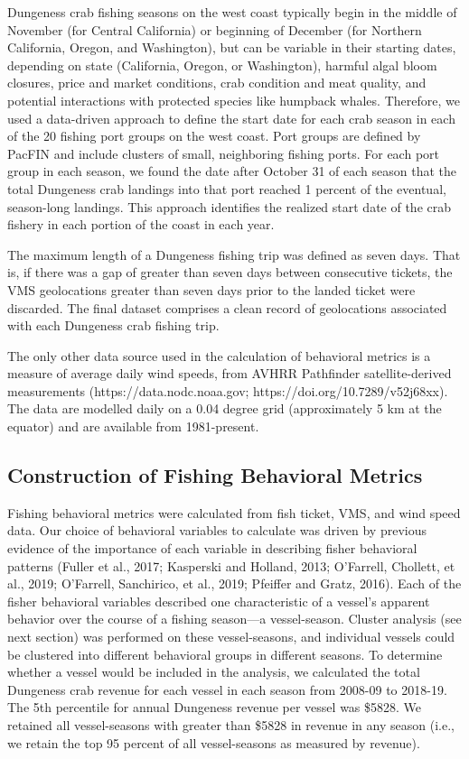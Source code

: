 \documentclass[]{elsarticle} %
\begin{document}
Dungeness crab fishing seasons on the west coast typically begin in the
middle of November (for Central California) or beginning of December
(for Northern California, Oregon, and Washington), but can be variable
in their starting dates, depending on state (California, Oregon, or
Washington), harmful algal bloom closures, price and market conditions,
crab condition and meat quality, and potential interactions with
protected species like humpback whales. Therefore, we used a data-driven
approach to define the start date for each crab season in each of the 20
fishing port groups on the west coast. Port groups are defined by PacFIN
and include clusters of small, neighboring fishing ports. For each port
group in each season, we found the date after October 31 of each season
that the total Dungeness crab landings into that port reached 1 percent
of the eventual, season-long landings. This approach identifies the
realized start date of the crab fishery in each portion of the coast in
each year.

The maximum length of a Dungeness fishing trip was defined as seven
days. That is, if there was a gap of greater than seven days between
consecutive tickets, the VMS geolocations greater than seven days prior
to the landed ticket were discarded. The final dataset comprises a clean
record of geolocations associated with each Dungeness crab fishing trip.

The only other data source used in the calculation of behavioral metrics
is a measure of average daily wind speeds, from AVHRR Pathfinder
satellite-derived measurements (https://data.nodc.noaa.gov;
https://doi.org/10.7289/v52j68xx). The data are modelled daily on a 0.04
degree grid (approximately 5 km at the equator) and are available from
1981-present.

\hypertarget{construction-of-fishing-behavioral-metrics}{%
\subsection{Construction of Fishing Behavioral
Metrics}\label{construction-of-fishing-behavioral-metrics}}

Fishing behavioral metrics were calculated from fish ticket, VMS, and
wind speed data. Our choice of behavioral variables to calculate was
driven by previous evidence of the importance of each variable in
describing fisher behavioral patterns (Fuller et al., 2017; Kasperski
and Holland, 2013; O'Farrell, Chollett, et al., 2019; O'Farrell,
Sanchirico, et al., 2019; Pfeiffer and Gratz, 2016). Each of the fisher
behavioral variables described one characteristic of a vessel's apparent
behavior over the course of a fishing season---a vessel-season. Cluster
analysis (see next section) was performed on these vessel-seasons, and
individual vessels could be clustered into different behavioral groups
in different seasons. To determine whether a vessel would be included in
the analysis, we calculated the total Dungeness crab revenue for each
vessel in each season from 2008-09 to 2018-19. The 5th percentile for
annual Dungeness revenue per vessel was \$5828. We retained all
vessel-seasons with greater than \$5828 in revenue in any season (i.e.,
we retain the top 95 percent of all vessel-seasons as measured by
revenue).
\end{document}
